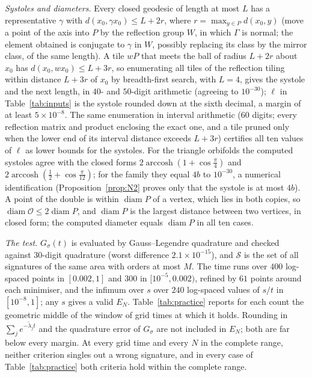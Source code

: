 \documentclass[pdflatex,sn-mathphys-num]{sn-jnl}
\theoremstyle{thmstyleone}%
\theoremstyle{thmstylethree}%
\newcommand{\Orb}{\mathcal{O}}
\newcommand{\diam}{\operatorname{diam}}
\begin{document}
\emph{Systoles and diameters.} Every closed geodesic of length at most $L$ has a representative $\gamma$ with $d(x_0,\gamma x_0)\le L+2r$, where $r=\max_{y\in P}d(x_0,y)$ (move a point of the axis into $P$ by the reflection group $W$, in which $\Gamma$ is normal; the element obtained is conjugate to $\gamma$ in $W$, possibly replacing its class by the mirror class, of the same length). A tile $wP$ that meets the ball of radius $L+2r$ about $x_0$ has $d(x_0,wx_0)\le L+3r$, so enumerating all tiles of the reflection tiling within distance $L+3r$ of $x_0$ by breadth-first search, with $L=4$, gives the systole and the next length, in $40$- and $50$-digit arithmetic (agreeing to $10^{-30}$); $\ell$ in Table~\ref{tab:inputs} is the systole rounded down at the sixth decimal, a margin of at least $5\times10^{-8}$. The same enumeration in interval arithmetic ($60$ digits; every reflection matrix and product enclosing the exact one, and a tile pruned only when the lower end of its interval distance exceeds $L+3r$) certifies all ten values of $\ell$ as lower bounds for the systoles. For the triangle orbifolds the computed systoles agree with the closed forms $2\operatorname{arccosh}(1+\cos\frac\pi4)$ and $2\operatorname{arccosh}(\frac12+\cos\frac\pi{12})$; for the family they equal $4b$ to $10^{-30}$, a numerical identification (Proposition~\ref{prop:N2} proves only that the systole is at most $4b$). A point of the double is within $\diam P$ of a vertex, which lies in both copies, so $\diam\Orb\le2\diam P$, and $\diam P$ is the largest distance between two vertices, in closed form; the computed diameter equals $\diam P$ in all ten cases.

\emph{The test.} $G_\sigma(t)$ is evaluated by Gauss--Legendre quadrature and checked against $30$-digit quadrature (worst difference $2.1\times10^{-15}$), and $\mathcal S$ is the set of all signatures of the same area with orders at most $M$. The time runs over $400$ log-spaced points in $[0.002,1]$ and $300$ in $[10^{-5},0.002)$, refined by $61$ points around each minimiser, and the infimum over $s$ over $240$ log-spaced values of $s/t$ in $[10^{-8},1]$; any $s$ gives a valid $E_N$. Table~\ref{tab:practice} reports for each count the geometric middle of the window of grid times at which it holds. Rounding in $\sum_je^{-\tilde\lambda_jt}$ and the quadrature error of $G_\sigma$ are not included in $E_N$; both are far below every margin. At every grid time and every $N$ in the complete range, neither criterion singles out a wrong signature, and in every case of Table~\ref{tab:practice} both criteria hold within the complete range.
\end{document}
